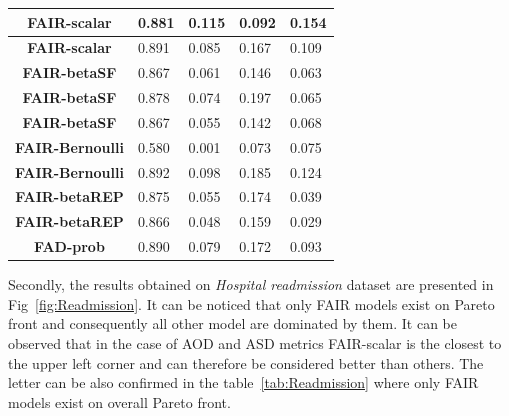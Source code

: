 \documentclass[preprint,12pt]{elsarticle}
\begin{document}
\begin{table}
\begin{tabular}{|c|l|l|l|l|}
		\textbf{FAIR-scalar}    & 0.881                             & 0.115                             & 0.092                             & 0.154                              \\ \hline
		\textbf{FAIR-scalar}    & 0.891                             & 0.085                             & 0.167                             & 0.109                              \\ \hline
		\textbf{FAIR-betaSF}    & 0.867                             & 0.061                             & 0.146                             & 0.063                              \\ \hline
		\textbf{FAIR-betaSF}    & 0.878                             & 0.074                             & 0.197                             & 0.065                              \\ \hline
		\textbf{FAIR-betaSF}    & 0.867                             & 0.055                             & 0.142                             & 0.068                              \\ \hline
		\textbf{FAIR-Bernoulli} & 0.580                             & 0.001                             & 0.073                             & 0.075                              \\ \hline
		\textbf{FAIR-Bernoulli} & 0.892                             & 0.098                             & 0.185                             & 0.124                              \\ \hline
		\textbf{FAIR-betaREP}   & 0.875                             & 0.055                             & 0.174                             & 0.039                              \\ \hline
		\textbf{FAIR-betaREP}   & 0.866                             & 0.048                             & 0.159                             & 0.029                              \\ \hline
		\textbf{FAD-prob}       & 0.890                             & 0.079                             & 0.172                             & 0.093                              \\ \hline
	\end{tabular}
	\label{tab:Adult}
\end{table}

Secondly, the results obtained on \textit{Hospital readmission} dataset are presented in Fig~\ref{fig:Readmission}. It can be noticed that only FAIR models exist on Pareto front and consequently all other model are dominated by them. It can be observed that in the case of AOD and ASD metrics FAIR-scalar is the closest to the upper left corner and can therefore be considered better than others. The letter can be also confirmed in the table~\ref{tab:Readmission} where only FAIR models exist on overall Pareto front.
\end{document}
